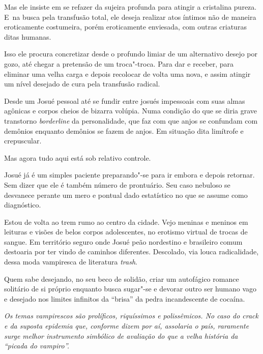 Mas ele insiste em se refazer da sujeira profunda para atingir a
cristalina pureza. E~na busca pela transfusão total, ele deseja realizar
atos íntimos não de maneira eroticamente costumeira, porém eroticamente
enviesada, com outras criaturas ditas humanas.

Isso ele procura concretizar desde o profundo limiar de um alternativo
desejo por gozo, até chegar a pretensão de um troca"-troca. Para dar e
receber, para eliminar uma velha carga e depois recolocar de volta uma
nova, e assim atingir um nível desejado de cura pela transfusão radical.

Desde um Josué pessoal até se fundir entre josués impessoais com suas
almas agônicas e corpos cheios de bizarra volúpia. Numa condição do que
se diria grave transtorno \emph{borderline} da personalidade, que faz
com que anjos se confundam com demônios enquanto demônios se fazem de
anjos. Em situação dita limítrofe e crepuscular.

\asterisc{}

Mas agora tudo aqui está sob relativo controle.

Josué já é um simples paciente preparando"-se para ir embora e depois
retornar. Sem dizer que ele é também número de prontuário. Seu caso
nebuloso se desvanece perante um mero e pontual dado estatístico no que
se assume como diagnóstico.

\asterisc{}

Estou de volta ao trem rumo ao centro da cidade. Vejo meninas e meninos
em leituras e visões de belos corpos adolescentes, no erotismo virtual
de trocas de sangue. Em território seguro onde Josué peão nordestino e
brasileiro comum destoaria por ter vindo de caminhos diferentes.
Descolado, via louca radicalidade, dessa moda vampiresca de literatura
\emph{trash}.

Quem sabe desejando, no seu beco de solidão, criar um autofágico romance
solitário de si próprio enquanto busca sugar"-se e devorar outro ser
humano vago e desejado nos limites infinitos da ``brisa'' da pedra
incandescente de cocaína.

\begin{center}\asterisc{}\end{center}
\begingroup\small

\emph{Os temas vampirescos são prolíficos, riquíssimos e polissêmicos.
No caso do crack e da suposta epidemia que, conforme dizem por aí,
assolaria o país, raramente surge melhor instrumento simbólico de
avaliação do que a velha história da ``picada do vampiro''.}

